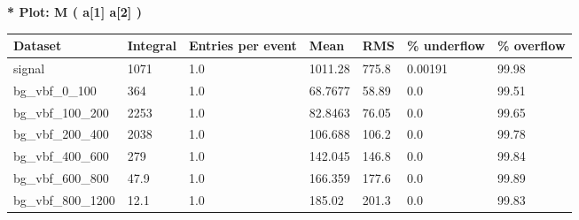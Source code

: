 \documentclass[a4paper, 10pt]{article}
\begin{document}
\textbf{* Plot: M ( a[1] a[2] ) }\\
   \begin{table}[H]
  \begin{center}
    \begin{tabular}{|m{23.0mm}|m{23.0mm}|m{18.0mm}|m{19.0mm}|m{19.0mm}|m{19.0mm}|m{19.0mm}|}
      \hline
      {\cellcolor{yellow}         Dataset}& {\cellcolor{yellow}         Integral}& {\cellcolor{yellow}         Entries per event}& {\cellcolor{yellow}         Mean}& {\cellcolor{yellow}         RMS}& {\cellcolor{yellow}         \% underflow}& {\cellcolor{yellow}         \% overflow}\\
      \hline
      {\cellcolor{white}         signal}& {\cellcolor{white}         1071}& {\cellcolor{white}         1.0}& {\cellcolor{white}         1011.28}& {\cellcolor{white}         775.8}& {\cellcolor{red}         0.00191}& {\cellcolor{red}         99.98}\\
      \hline
      {\cellcolor{white}         bg\_vbf\_0\_100}& {\cellcolor{white}         364}& {\cellcolor{white}         1.0}& {\cellcolor{white}         68.7677}& {\cellcolor{white}         58.89}& {\cellcolor{red}         0.0}& {\cellcolor{red}         99.51}\\
      \hline
      {\cellcolor{white}         bg\_vbf\_100\_200}& {\cellcolor{white}         2253}& {\cellcolor{white}         1.0}& {\cellcolor{white}         82.8463}& {\cellcolor{white}         76.05}& {\cellcolor{red}         0.0}& {\cellcolor{red}         99.65}\\
      \hline
      {\cellcolor{white}         bg\_vbf\_200\_400}& {\cellcolor{white}         2038}& {\cellcolor{white}         1.0}& {\cellcolor{white}         106.688}& {\cellcolor{white}         106.2}& {\cellcolor{red}         0.0}& {\cellcolor{red}         99.78}\\
      \hline
      {\cellcolor{white}         bg\_vbf\_400\_600}& {\cellcolor{white}         279}& {\cellcolor{white}         1.0}& {\cellcolor{white}         142.045}& {\cellcolor{white}         146.8}& {\cellcolor{red}         0.0}& {\cellcolor{red}         99.84}\\
      \hline
      {\cellcolor{white}         bg\_vbf\_600\_800}& {\cellcolor{white}         47.9}& {\cellcolor{white}         1.0}& {\cellcolor{white}         166.359}& {\cellcolor{white}         177.6}& {\cellcolor{red}         0.0}& {\cellcolor{red}         99.89}\\
      \hline
      {\cellcolor{white}         bg\_vbf\_800\_1200}& {\cellcolor{white}         12.1}& {\cellcolor{white}         1.0}& {\cellcolor{white}         185.02}& {\cellcolor{white}         201.3}& {\cellcolor{red}         0.0}& {\cellcolor{red}         99.83}\\

\end{tabular}
\end{center}
\end{table}
\end{document}
